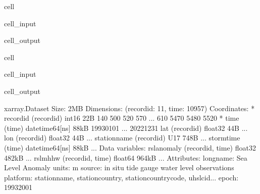 \documentclass[letterpaper,10pt,english]{jupyterBook}
\begin{document}
\begin{sphinxuseclass}{cell}
\begin{sphinxVerbatimInput}
\begin{sphinxuseclass}{cell_input}
\begin{sphinxVerbatim}[commandchars=\\\{\}]
\end{sphinxVerbatim}

\end{sphinxuseclass}\end{sphinxVerbatimInput}
\begin{sphinxVerbatimOutput}

\begin{sphinxuseclass}{cell_output}
\noindent{}

\end{sphinxuseclass}\end{sphinxVerbatimOutput}

\end{sphinxuseclass}
\begin{sphinxuseclass}{cell}\begin{sphinxVerbatimInput}

\begin{sphinxuseclass}{cell_input}
\begin{sphinxVerbatim}[commandchars=\\\{\}]
\end{sphinxVerbatim}

\end{sphinxuseclass}\end{sphinxVerbatimInput}
\begin{sphinxVerbatimOutput}

\begin{sphinxuseclass}{cell_output}
\begin{sphinxVerbatim}[commandchars=\\\{\}]
\PYGZlt{}xarray.Dataset\PYGZgt{} Size: 2MB
Dimensions:       (record\PYGZus{}id: 11, time: 10957)
Coordinates:
  * record\PYGZus{}id     (record\PYGZus{}id) int16 22B 140 500 520 570 ... 610 5470 5480 5520
  * time          (time) datetime64[ns] 88kB 1993\PYGZhy{}01\PYGZhy{}01 ... 2022\PYGZhy{}12\PYGZhy{}31
    lat           (record\PYGZus{}id) float32 44B ...
    lon           (record\PYGZus{}id) float32 44B ...
    station\PYGZus{}name  (record\PYGZus{}id) \PYGZlt{}U17 748B ...
    storm\PYGZus{}time    (time) datetime64[ns] 88kB ...
Data variables:
    rsl\PYGZus{}anomaly   (record\PYGZus{}id, time) float32 482kB ...
    rsl\PYGZus{}mhhw      (record\PYGZus{}id, time) float64 964kB ...
Attributes:
    long\PYGZus{}name:  Sea Level Anomaly
    units:      m
    source:     in situ tide gauge water level observations
    platform:   station\PYGZus{}name, station\PYGZus{}country, station\PYGZus{}country\PYGZus{}code, uhslc\PYGZus{}id...
    epoch:      1993\PYGZhy{}2001
\end{sphinxVerbatim}

\end{sphinxuseclass}\end{sphinxVerbatimOutput}

\end{sphinxuseclass}
\end{document}
